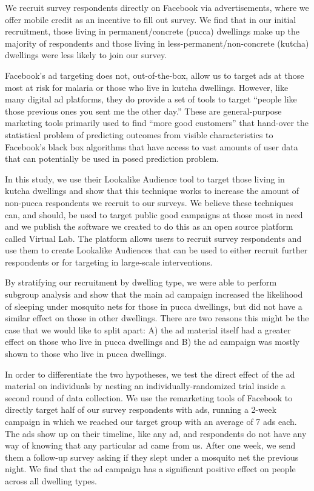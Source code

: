 \documentclass[a4paper,12pt]{article}
\begin{document}
We recruit survey respondents directly on Facebook via advertisements, where we offer mobile credit as an incentive to fill out survey. We find that in our initial recruitment, those living in permanent/concrete (pucca) dwellings make up the majority of respondents and those living in less-permanent/non-concrete (kutcha) dwellings were less likely to join our survey.

Facebook's ad targeting does not, out-of-the-box, allow us to target ads at those most at risk for malaria or those who live in kutcha dwellings. However, like many digital ad platforms, they do provide a set of tools to target ``people like those previous ones you sent me the other day.'' These are general-purpose marketing tools primarily used to find ``more good customers'' that hand-over the statistical problem of predicting outcomes from visible characteristics to Facebook's black box algorithms that have access to vast amounts of user data that can potentially be used in posed prediction problem.

In this study, we use their Lookalike Audience tool to target those living in kutcha dwellings and show that this technique works to increase the amount of non-pucca respondents we recruit to our surveys. We believe these techniques can, and should, be used to target public good campaigns at those most in need and we publish the software we created to do this as an open source platform called Virtual Lab. The platform allows users to recruit survey respondents and use them to create Lookalike Audiences that can be used to either recruit further respondents or for targeting in large-scale interventions.

By stratifying our recruitment by dwelling type, we were able to perform subgroup analysis and show that the main ad campaign increased the likelihood of sleeping under mosquito nets for those in pucca dwellings, but did not have a similar effect on those in other dwellings. There are two reasons this might be the case that we would like to split apart: A) the ad material itself had a greater effect on those who live in pucca dwellings and B) the ad campaign was mostly shown to those who live in pucca dwellings.

In order to differentiate the two hypotheses, we test the direct effect of the ad material on individuals by nesting an individually-randomized trial inside a second round of data collection. We use the remarketing tools of Facebook to directly target half of our survey respondents with ads, running a 2-week campaign in which we reached our target group with an average of 7 ads each. The ads show up on their timeline, like any ad, and respondents do not have any way of knowing that any particular ad came from us. After one week, we send them a follow-up survey asking if they slept under a mosquito net the previous night. We find that the ad campaign has a significant positive effect on people across all dwelling types.
\end{document}
